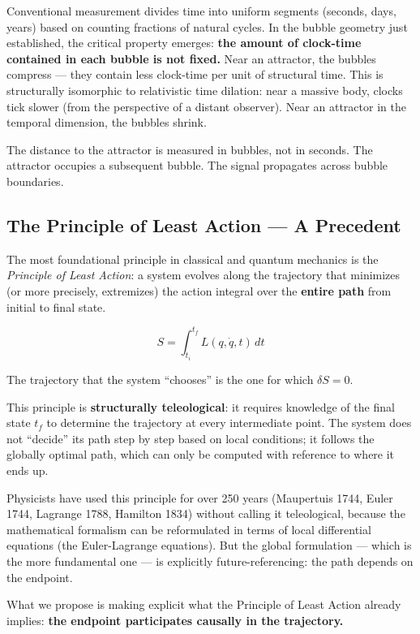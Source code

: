 \documentclass[12pt,a4paper]{article}
\begin{document}
Conventional measurement divides time into uniform segments (seconds, days, years) based on counting fractions of natural cycles. In the bubble geometry just established, the critical property emerges: \textbf{the amount of clock-time contained in each bubble is not fixed.} Near an attractor, the bubbles compress --- they contain less clock-time per unit of structural time. This is structurally isomorphic to relativistic time dilation: near a massive body, clocks tick slower (from the perspective of a distant observer). Near an attractor in the temporal dimension, the bubbles shrink.

The distance to the attractor is measured in bubbles, not in seconds. The attractor occupies a subsequent bubble. The signal propagates across bubble boundaries.

\subsection{The Principle of Least Action --- A Precedent}

The most foundational principle in classical and quantum mechanics is the \emph{Principle of Least Action}: a system evolves along the trajectory that minimizes (or more precisely, extremizes) the action integral over the \textbf{entire path} from initial to final state.

\begin{equation}\label{eq:action}
S = \int_{t_i}^{t_f} L(q, \dot{q}, t)\,dt
\end{equation}

The trajectory that the system ``chooses'' is the one for which $\delta S = 0$.

This principle is \textbf{structurally teleological}: it requires knowledge of the final state $t_f$ to determine the trajectory at every intermediate point. The system does not ``decide'' its path step by step based on local conditions; it follows the globally optimal path, which can only be computed with reference to where it ends up.

Physicists have used this principle for over 250 years (Maupertuis 1744, Euler 1744, Lagrange 1788, Hamilton 1834) without calling it teleological, because the mathematical formalism can be reformulated in terms of local differential equations (the Euler-Lagrange equations). But the global formulation --- which is the more fundamental one --- is explicitly future-referencing: the path depends on the endpoint.

What we propose is making explicit what the Principle of Least Action already implies: \textbf{the endpoint participates causally in the trajectory.}
\end{document}
